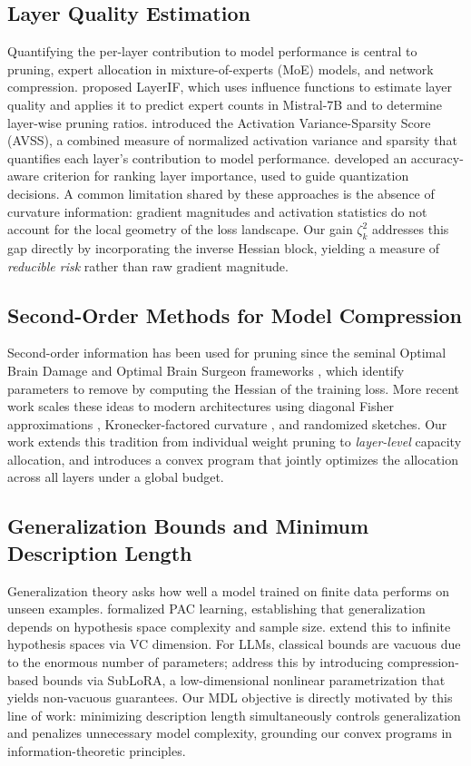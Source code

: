 \documentclass[accepted]{uai2026}%
\theoremstyle{remark}%
\begin{document}
\subsection{Layer Quality Estimation}
Quantifying the per-layer contribution to model performance is central
to pruning, expert allocation in mixture-of-experts (MoE) models,
and network compression.
\citet{layerIF} proposed LayerIF, which uses influence functions to
estimate layer quality and applies it to predict expert counts in
Mistral-7B and to determine layer-wise pruning ratios.
\citet{AVSS} introduced the Activation Variance-Sparsity Score (AVSS),
a combined measure of normalized activation variance and sparsity
that quantifies each layer's contribution to model performance.
\citet{layerImportanceEstimation} developed an accuracy-aware criterion
for ranking layer importance, used to guide quantization decisions.
A common limitation shared by these approaches is the absence of
curvature information: gradient magnitudes and activation statistics
do not account for the local geometry of the loss landscape.
Our gain $\zeta_k^2$ addresses this gap directly by incorporating
the inverse Hessian block, yielding a measure of \emph{reducible risk}
rather than raw gradient magnitude.

\subsection{Second-Order Methods for Model Compression}
Second-order information has been used for pruning since the seminal
Optimal Brain Damage \citet{lecun1989obd} and Optimal Brain Surgeon frameworks \citet{hassibi1993obs}, which identify parameters to remove
by computing the Hessian of the training loss.
More recent work scales these ideas to modern architectures using
diagonal Fisher approximations \citet{martens2015optimizing},
Kronecker-factored curvature \citet{botev2017practical}, and
randomized sketches.
Our work extends this tradition from individual weight pruning to
\emph{layer-level} capacity allocation, and introduces a convex
program that jointly optimizes the allocation across all layers under
a global budget.

\subsection{Generalization Bounds and Minimum Description Length}
Generalization theory asks how well a model trained on finite data
performs on unseen examples.
\citet{Valiant1984ATO} formalized PAC learning, establishing that
generalization depends on hypothesis space complexity and sample size.
\citet{ShalevShwartz2014UnderstandingML} extend this to infinite
hypothesis spaces via VC dimension.
For LLMs, classical bounds are vacuous due to the enormous number of
parameters; \citet{Lotfi2023NonVacuousGB} address this by introducing
compression-based bounds via SubLoRA, a low-dimensional nonlinear
parametrization that yields non-vacuous guarantees.
Our MDL objective is directly motivated by this line of work:
minimizing description length simultaneously controls generalization
and penalizes unnecessary model complexity, grounding our convex
programs in information-theoretic principles.
\end{document}
